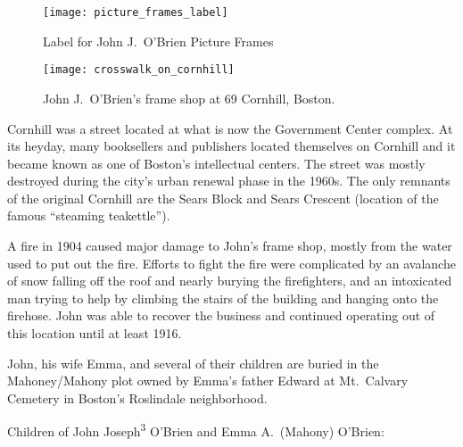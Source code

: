 \begin{figure}
	\centering
	\texttt{[image: picture\_frames\_label]}
	\caption{Label for John J.\ O'Brien Picture Frames}
	\label{fig:PictureFrameLabel}
\end{figure}

\begin{figure}
	\centering
	\texttt{[image: crosswalk\_on\_cornhill]}
	\caption{John J.\ O'Brien's frame shop at 69 Cornhill, Boston.}
	\label{fig:FrameStore}
\end{figure}

Cornhill was a street located at what is now the Government Center complex. At its heyday, many booksellers and publishers located themselves on Cornhill and it became known as one of Boston's intellectual centers.\cite{Cornhill:1} The street was mostly destroyed during the city's urban renewal phase in the 1960s. The only remnants of the original Cornhill are the Sears Block and Sears Crescent (location of the famous ``steaming teakettle'').\cite{Cornhill:2}

A fire in 1904 caused major damage to John's frame shop, mostly from the water used to put out the fire. Efforts to fight the fire were complicated by an avalanche of snow falling off the roof and nearly burying the firefighters, and an intoxicated man trying to help by climbing the stairs of the building and hanging onto the firehose.\cite{FrameShopFire:2} John was able to recover the business and continued operating out of this location until at least 1916.\cite{John3OBrien1916:3}

John, his wife Emma, and several of their children are buried in the Maho\-ney/Maho\-ny plot owned by Emma's father Edward at Mt.\ Calvary Cemetery in Boston's Roslindale neighborhood.\cite{John3OBrienBurial:2}

\begin{KidsIntro}
	Children of John Joseph\textsuperscript{3} O'Brien and Emma A.\ (Mahony) O'Brien:
\end{KidsIntro}


